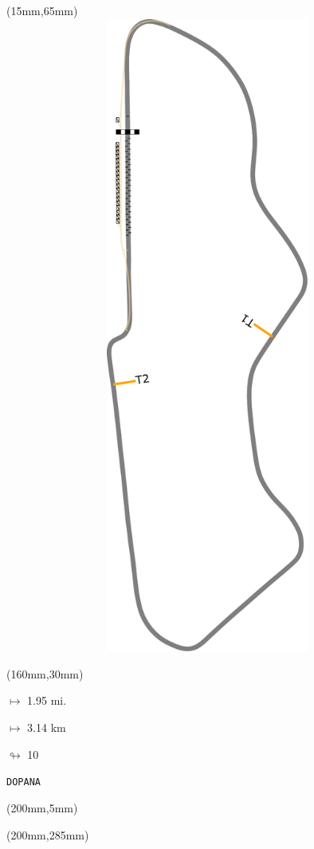 \begin{textblock*}{185mm}(15mm,65mm)%
\centering
\mbox{\includegraphics[width=185mm,height=210mm,keepaspectratio]{PT/DOPANA.pdf}}
\end{textblock*}
\begin{textblock*}{40mm}(160mm,30mm)%
\Large
\par$\mapsto$ 1.95 mi.
\par$\mapsto$ 3.14 km
\par$\looparrowright$ 10
\par\hfill\tiny\tt DOPANA\\
\end{textblock*}
\begin{textblock*}{20mm}(200mm,5mm)%
\fbox{\thepage}
\label{DOPANA}
\end{textblock*}
\begin{textblock*}{20mm}(200mm,285mm)%
\fbox{\thepage}
\end{textblock*}

